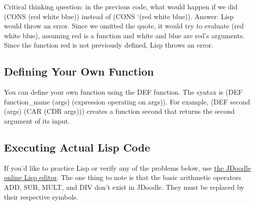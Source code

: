 \documentclass[10pt]{article}
\begin{document}
Critical thinking question: in the previous code, what would
happen if we did (CONS (red white blue)) instead of (CONS `(red white blue)).
Answer: Lisp would throw an error.
Since we omitted the quote, it would try to evaluate (red white blue),
assuming red is a function and white and blue are red's arguments.
Since the function red is not previously defined, Lisp throws an error.

\subsection{Defining Your Own Function}
You can define your own function using the DEF function.
The syntax is (DEF function\_name (args) (expression operating on args)).
For example, (DEF second (args) (CAR (CDR args))) creates
a function second that returns the second argument of its input.

\subsection{Executing Actual Lisp Code}
If you'd like to practice Lisp or verify any of the problems below, use
\href{https://www.jdoodle.com/execute-clisp-online}{the JDoodle online Lisp editor}.
The one thing to note is that the basic arithmetic operators ADD, SUB, MULT, and DIV
don't exist in JDoodle.
They must be replaced by their respective symbols.
\end{document}
